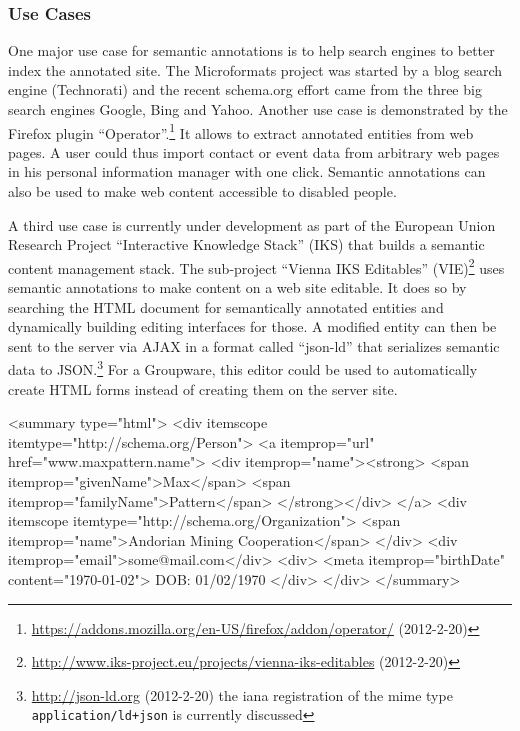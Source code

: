 \documentclass[12pt,a4paper]{scrartcl}		%
\newcommand{\citeurl}[2]{\url{#1} (#2)}
\begin{document}
\subsubsection{Use Cases}

One major use case for semantic annotations is to help search engines to better
index the annotated site. The Microformats project was started by a blog search
engine (Technorati)\cite{Celik2006} and the recent schema.org effort came from
the three big search engines Google, Bing and Yahoo.\cite{Goel2011} Another use
case is demonstrated by the Firefox plugin
``Operator''.\footnote{\citeurl{https://addons.mozilla.org/en-US/firefox/addon/operator/}{2012-2-20}}
It allows to extract annotated entities from web pages. A user could thus import
contact or event data from arbitrary web pages in his personal information
manager with one click. Semantic annotations can also be used to make web
content accessible to disabled people\cite{Yesilada:2007:EDS:1279700.1279704}.

A third use case is currently under development as part of the European Union
Research Project ``Interactive Knowledge Stack'' (IKS) that builds a semantic
content management stack. The sub-project ``Vienna IKS Editables''
(VIE)\footnote{\citeurl{http://www.iks-project.eu/projects/vienna-iks-editables}{2012-2-20}}
uses semantic annotations to make content on a web site editable. It does so by
searching the HTML document for semantically annotated entities and dynamically
building editing interfaces for those. A modified entity can then be sent to the
server via AJAX in a format called ``json-ld'' that serializes semantic data to
JSON.\footnote{\citeurl{http://json-ld.org}{2012-2-20} the iana registration of
  the mime type \lstinline:application/ld+json: is currently discussed}
For a Groupware, this editor could be used to automatically create HTML forms instead
of creating them on the server site.

\begin{anylisting}[label=fig:microdata-atom-summary,
                   language=xml,
                   caption={Microdata used in the summary of an ATOM entry summary (markup not escaped for clarity)}]
<summary type="html">
  <div itemscope itemtype="http://schema.org/Person">
    <a itemprop="url" href="www.maxpattern.name">
      <div itemprop="name"><strong>
        <span itemprop="givenName">Max</span>
        <span itemprop="familyName">Pattern</span>
      </strong></div>
    </a>
    <div itemscope itemtype="http://schema.org/Organization">
      <span itemprop="name">Andorian Mining Cooperation</span>
    </div>
    <div itemprop="email">some@mail.com</div>
    <div>
      <meta itemprop="birthDate" content="1970-01-02">
      DOB: 01/02/1970
    </div>
  </div>
</summary>  
\end{anylisting}
\end{document}
